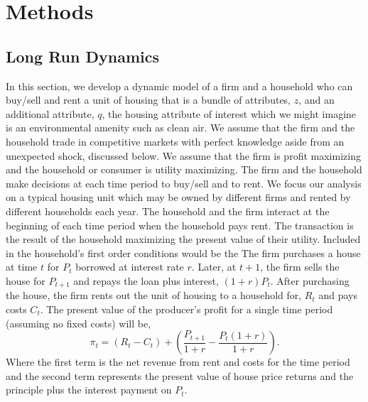 \documentclass[ecta,nameyear,draft]{econsocart}
\theoremstyle{plain}
\theoremstyle{remark}
\begin{document}
\section{Methods}
\subsection{Long Run Dynamics}
In this section, we develop a dynamic model of a firm and a household who can buy/sell and rent a unit of housing that is a bundle of attributes, $z$, and an additional attribute, $q$, the housing attribute of interest which we might imagine is an environmental amenity such as clean air. We assume that the firm and the household trade in competitive markets with perfect knowledge aside from an unexpected shock, discussed below.
We assume that the firm is profit maximizing and the household or consumer is utility maximizing. The firm and the household make decisions at each time period to buy/sell and to rent. We focus our analysis on a typical housing unit which may be owned by different firms and rented by different households each year. 
The household and the firm interact at the beginning of each time period when the household pays rent. The transaction is the result of the household maximizing the present value of their utility. Included in the household's first order conditions would be the  
The firm purchases a house at time $t$ for $P_t$ borrowed at interest rate $r$. Later, at $t+1$, the firm sells the house for $P_{t+1}$ and repays the loan plus interest, $(1 + r)P_t$. After purchasing the house, the firm rents
out the unit of housing to a household for, $R_t$ and pays costs $C_t$. The present value of the producer’s profit for a single time period (assuming no fixed costs) will be,
\begin{equation}
	\pi_t = (R_t-C_t)+\left(\frac{P_{t+1}}{1+r}-\frac{P_t(1+r)}{1+r}\right).\label{pi1}
\end{equation}
Where the first term is the net revenue from rent and costs for the time period and the second term
represents the present value of house price returns and the principle plus the interest payment on $P_t$.
\end{document}
